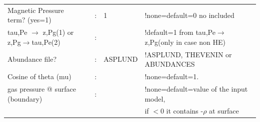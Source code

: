 \begin{table}
\begin{tabular}{lrcll}
Magnetic Pressure term? (yes=1)   &   &:& 1              &!none=default=0 no included\\
tau,Pe $\rightarrow$ z,Pg(1) or z,Pg$\rightarrow$tau,Pe(2)  &   &:&            &!default=1 from tau,Pe$\rightarrow$z,Pg(only in case non HE)\\
Abundance file?                   &   &:& ASPLUND        &!ASPLUND, THEVENIN or ABUNDANCES\\
Cosine of theta (mu)              &   &:&                &!none=default=1. \\
gas pressure @ surface (boundary) &   &:&                &!none=default=value of the input model, \\
                                  &   & &                &{ } { }{ } if $< 0$ it contains -$\rho$ at surface \\

\end{tabular}
\end{table}


